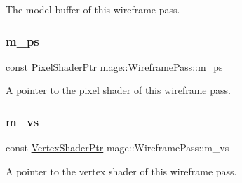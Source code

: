 The model buffer of this wireframe pass. \hypertarget{classmage_1_1_wireframe_pass_a69da5f7e268b4265838bb6b378ed3061}{}\label{classmage_1_1_wireframe_pass_a69da5f7e268b4265838bb6b378ed3061} 
\subsubsection{\texorpdfstring{m\+\_\+ps}{m\_ps}}
{\footnotesize\ttfamily const \hyperlink{namespacemage_acbec875bb5e5e085e32ed244a24d2b6f}{Pixel\+Shader\+Ptr} mage\+::\+Wireframe\+Pass\+::m\+\_\+ps\hspace{0.3cm}{\ttfamily [private]}}

A pointer to the pixel shader of this wireframe pass. \hypertarget{classmage_1_1_wireframe_pass_ab128eede9f9f4afa20e9e59c249eea1f}{}\label{classmage_1_1_wireframe_pass_ab128eede9f9f4afa20e9e59c249eea1f} 
\subsubsection{\texorpdfstring{m\+\_\+vs}{m\_vs}}
{\footnotesize\ttfamily const \hyperlink{namespacemage_a1f19b094f771e30bc0a6c1cebcc0dd58}{Vertex\+Shader\+Ptr} mage\+::\+Wireframe\+Pass\+::m\+\_\+vs\hspace{0.3cm}{\ttfamily [private]}}

A pointer to the vertex shader of this wireframe pass. 